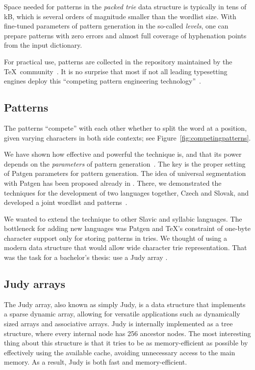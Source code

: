 \documentclass{csbulletin}
\let\stress=\emph
\let\program=\textrm %
\newcommand{\Patgen}{\program{Patgen}\xspace}
\begin{document}
Space needed for patterns in the \stress{packed trie} data structure is typically in tens of kB, which is several orders of magnitude smaller than the wordlist size.
With fine-tuned parameters of pattern generation in the so-called \stress{levels}, one can prepare patterns with zero errors and almost full coverage of hyphenation points from the input dictionary.

For practical use, patterns are collected in the repository maintained by the \TeX\ community~\cite{tex:hyphenationweb-2023-07-05}. 
It is no surprise that most if not all leading typesetting engines deploy this ``competing pattern engineering technology''~\cite{nlp:sojka2000competing}.


\subsection{Patterns}

The patterns ``compete'' with each other whether to split the word at a position, given varying characters in both side contexts; see Figure~\ref{fig:competingpatterns}.

We have shown how effective and powerful the technique is,
and that its power depends on the \emph{parameters} of pattern generation~\cite{tex:sojkas2019unreasonable}.
The key is the proper setting of \Patgen parameters for pattern generation.
The idea of universal segmentation with \Patgen has been proposed already in \cite{nlp:SojkaetSojkaraslan2019}.
There, we demonstrated the techniques for the development of two languages together, Czech and Slovak, and developed a joint wordlist and patterns~\cite{tex:sojkas2021czechoslovak}.

We wanted to extend the technique to other Slavic and syllabic languages.
The bottleneck for adding new languages was \Patgen and \TeX's constraint of one-byte character support only for storing patterns in tries.
We thought of using a modern data structure that would allow wide character trie representation. 
That was the task for a bachelor's thesis: use a Judy array \cite{tex:Maca-bachelor2023fortugboat}.

\subsection{Judy arrays}
The Judy array, also known as simply Judy, is a data structure that implements a sparse dynamic array, allowing for versatile applications such as dynamically sized arrays and associative arrays. 
Judy is internally implemented as a tree structure, where every internal node has 256 ancestor nodes.
The most interesting thing about this structure is that it tries to be as memory-efficient as possible by effectively using the available cache, avoiding unnecessary access to the main memory.
As a result, Judy is both fast and memory-efficient.
\end{document}
